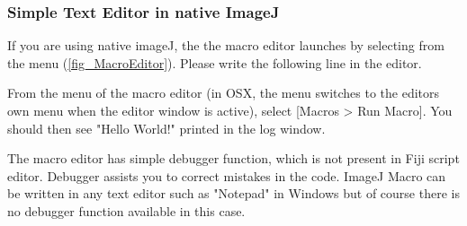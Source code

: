 \subsubsection{Simple Text Editor in native ImageJ}
\label{part:nativeeditor}

If you are using native imageJ, the the macro editor launches by selecting  from the menu (\ref{fig_MacroEditor}). 
Please write the following line in the editor.

From the menu of the macro editor (in OSX, the menu switches to the editors own menu when the editor window is active), select [Macros > Run Macro]. You should then see "Hello World!" printed in the log window.

The macro editor has simple debugger function, which is not present in Fiji script editor. Debugger assists you to correct mistakes in the code. ImageJ Macro can be written in any text editor such as "Notepad" in Windows but of course there is no debugger function available in this case.